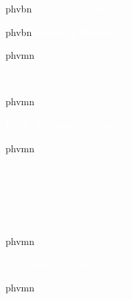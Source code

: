 

\setlength{\columnsep}{20pt}

\begin{multicols}{2}

 
\begin{shaded}

\vspace{0.01cm}

\fontsize{20}{10}  {phv}{b}{n} \selectfont \noindent \textcolor{white}{AstroPAH Newsletter}

\vspace{0.1cm}

\fontsize{16}{10}  {phv}{b}{n} \selectfont \noindent \textcolor{white}{\textbf{Editorial Board:}}

\vspace{0.5cm}


\fontsize{13}{10}  {phv}{m}{n} \selectfont 

\noindent \textcolor{white}{Editor-in-Chief}

\fontsize{14}{10}  {phv}{m}{n} \selectfont 

\textcolor{white}{\textbf{Prof. Alexander Tielens}}

\fontsize{13}{10}  {phv}{m}{n} \selectfont 

\textcolor{white}{Leiden Observatory}

\vspace{-0.15cm}

\textcolor{white}{(The Netherlands)}

\vspace{0.4cm}


\noindent \textcolor{white}{Executive Editor}

\fontsize{14}{10}  {phv}{m}{n} \selectfont 

\textcolor{white}{\textbf{Dr. Isabel Aleman}}

\fontsize{13}{10}  {phv}{m}{n} \selectfont 


\end{shaded}
\end{multicols}
